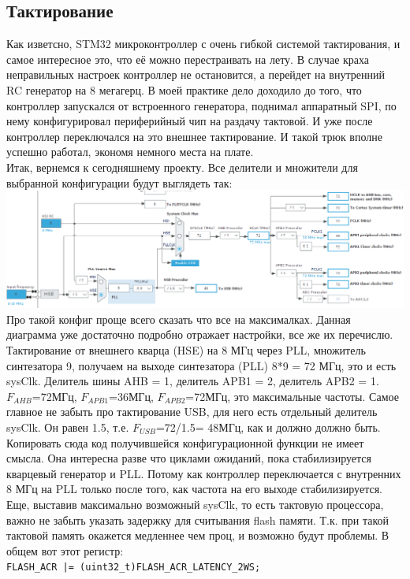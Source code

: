 \documentclass[12pt,a4paper]{article}
\begin{document}
\subsection{Тактирование}
    Как изветсно, STM32 микроконтроллер с очень гибкой системой тактирования,
    и самое интересное это, что её можно перестраивать на лету. В случае краха
    неправильных настроек контроллер не остановится, а перейдет на внутренний
    RC генератор на 8 мегагерц. В моей практике дело доходило до того, что
    контроллер запускался от встроенного генератора, поднимал аппаратный SPI,
    по нему конфигурировал периферийный чип на раздачу тактовой. И уже после
    контроллер переключался на это внешнее тактирование. И такой трюк вполне
    успешно работал, экономя немного места на плате.\\
    Итак, вернемся к
    сегодняшнему проекту. Все делители и множители для выбранной конфигурации
    будут выглядеть так:\\
\includegraphics[width=15cm]{tact.png}\\
    Про такой конфиг проще всего сказать что все на максималках. Данная
    диаграмма уже достаточно подробно отражает настройки, все же их перечислю.
    Тактирование от внешнего кварца (HSE) на 8 МГц через PLL, множитель синтезатора 9,
    получаем на выходе синтезатора (PLL) 8*9 = 72 МГц, это и есть sysClk.
    Делитель шины AHB = 1, делитель APB1 = 2, делитель APB2 = 1.
    $F_{AHB}$=72МГц, $F_{APB1}$=36МГц, $F_{APB2}$=72МГц, это максимальные частоты.
    Самое главное не забыть про тактирование USB, для него есть отдельный
    делитель sysClk. Он равен 1.5, т.е. $F_{USB}$=72/1.5= 48МГц, как и должно
    должно быть.\\
    Копировать сюда код получившейся конфигурационной функции не имеет смысла.
    Она интересна разве что циклами ожиданий, пока стабилизируется кварцевый
    генератор и PLL. Потому как контроллер переключается с внутренних 8 МГц на
    PLL только после того, как частота на его выходе стабилизируется.\\
    Еще, выставив максимально возможный sysClk, то есть тактовую процессора,
    важно не забыть указать задержку для считывания flash памяти. Т.к. при
    такой тактовой память окажется медленнее чем проц, и возможно будут
    проблемы. В общем вот этот регистр:\\
    \lstinline{FLASH_ACR |= (uint32_t)FLASH_ACR_LATENCY_2WS;}
\end{document}
